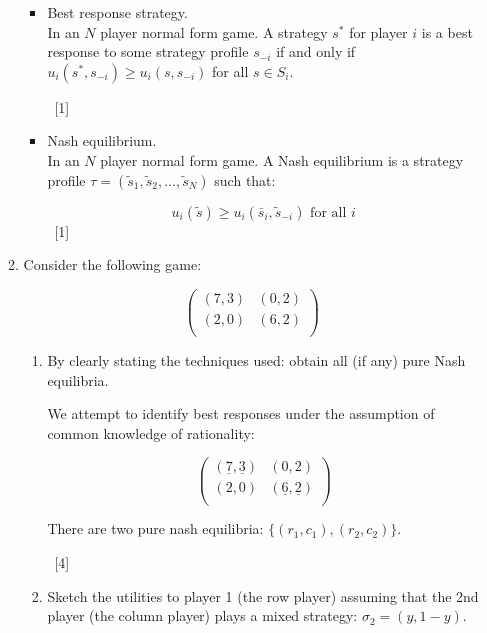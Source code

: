 \documentclass[12pt,a4paper]{article}
\begin{document}
\begin{enumerate}
\begin{enumerate}
\begin{itemize}
                \item Best response strategy.\\

                In an $N$ player normal form game. A strategy $s^*$ for player $i$ is a best response to some strategy profile $s_{-i}$ if and only if $u_i(s^*,s_{-i})\geq u_{i}(s,s_{-i})$ for all $s\in S_i$.

                ~\hfill{[1]}

                \item Nash equilibrium.\\

                In an $N$ player normal form game. A Nash equilibrium is a strategy profile $\tau = (\tilde s_1,\tilde s_2,\dots,\tilde s_N)$ such that:

                $$u_i(\tilde s)\geq u_i(\bar s_i,\tilde s_{-i})\text{ for all }i$$
                ~\hfill{[1]}
            \end{itemize}

       \item
        Consider the following game:

            \[\begin{pmatrix}
            (7,3) & (0,2)\\
            (2,0) & (6,2)\\
            \end{pmatrix}\]

       \begin{enumerate}
        \item By clearly stating the techniques used: obtain all (if any) pure Nash equilibria.

            We attempt to identify best responses under the assumption of common knowledge of rationality:


            \[\begin{pmatrix}
                    (\underline{7},\underline{3}) & (0,2)\\
                    (2,0) & (\underline{6},\underline{2})\\
            \end{pmatrix}\]

            There are two pure nash equilibria: \(\{(r_1, c_1), (r_2,c_2)\}\).

        ~\hfill{[4]}

        \item Sketch the utilities to player 1 (the row player) assuming that the 2nd player (the column player) plays a mixed strategy: $\sigma_2 = (y,1-y)$.


\end{enumerate}
\end{enumerate}
\end{enumerate}
\end{document}
